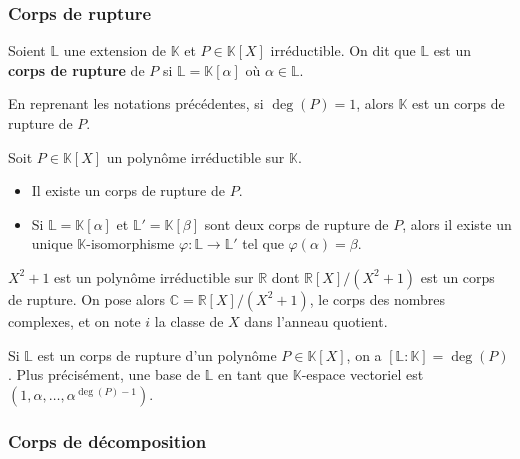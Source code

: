 	\subsubsection{Corps de rupture}
	
	
	\begin{definition}
		Soient $\mathbb{L}$ une extension de $\mathbb{K}$ et $P \in \mathbb{K}[X]$ irréductible. On dit que $\mathbb{L}$ est un \textbf{corps de rupture} de $P$ si $\mathbb{L} = \mathbb{K}[\alpha]$ où $\alpha \in \mathbb{L}$.
	\end{definition}
	
	\begin{example}
		En reprenant les notations précédentes, si $\deg(P) = 1$, alors $\mathbb{K}$ est un corps de rupture de $P$.
	\end{example}
	
	\begin{theorem}
		Soit $P \in \mathbb{K}[X]$ un polynôme irréductible sur $\mathbb{K}$.
		\begin{itemize}
			\item Il existe un corps de rupture de $P$.
			\item Si $\mathbb{L} = \mathbb{K}[\alpha]$ et $\mathbb{L}' = \mathbb{K}[\beta]$ sont deux corps de rupture de $P$, alors il existe un unique $\mathbb{K}$-isomorphisme $\varphi : \mathbb{L} \rightarrow \mathbb{L}'$ tel que $\varphi(\alpha) = \beta$.
		\end{itemize}
	\end{theorem}
	
	\begin{application}
		$X^2 + 1$ est un polynôme irréductible sur $\mathbb{R}$ dont $\mathbb{R}[X]/(X^2+1)$ est un corps de rupture. On pose alors $\mathbb{C} = \mathbb{R}[X]/(X^2+1)$, le corps des nombres complexes, et on note $i$ la classe de $X$ dans l'anneau quotient.
	\end{application}
	
	\begin{remark}
		Si $\mathbb{L}$ est un corps de rupture d'un polynôme $P \in \mathbb{K}[X]$, on a $[\mathbb{L}:\mathbb{K}] = \deg(P)$. Plus précisément, une base de $\mathbb{L}$ en tant que $\mathbb{K}$-espace vectoriel est $(1, \alpha, \dots, \alpha^{\deg(P)-1})$.
	\end{remark}
	
	\subsubsection{Corps de décomposition}
	
